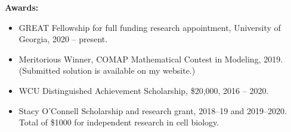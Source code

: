 \textbf{Awards:}

\begin{itemize}[noitemsep]
\item GREAT Fellowship for full funding research appointment, University of Georgia, 2020 -- present.
\item Meritorious Winner, COMAP Mathematical Contest in Modeling, 2019. (Submitted solution is available on my website.)
\item WCU Distinguished Achievement Scholarship, \$20,000, 2016 -- 2020.
\item Stacy O'Connell Scholarship and research grant, 2018--19 and 2019--2020. Total of \$1000 for independent research in cell biology.
\end{itemize}